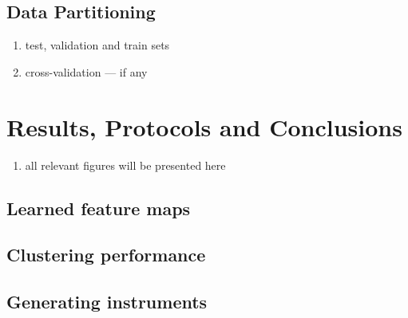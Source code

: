 \documentclass{article}[12pt]
\numberwithin{equation}{section}
\begin{document}
\subsection{Data Partitioning}
\begin{enumerate}
	\item test, validation and train sets
	\item cross-validation --- if any
\end{enumerate}

\section{Results, Protocols and Conclusions}
\begin{enumerate}
	\item all relevant figures will be presented here
\end{enumerate}
\subsection{Learned feature maps}

\subsection{Clustering performance}

\subsection{Generating instruments}



\end{document}
